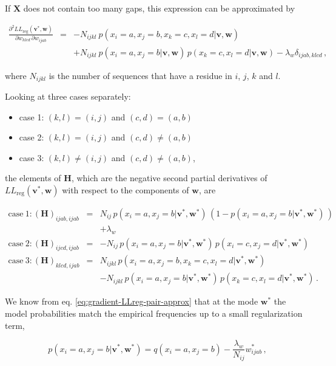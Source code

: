 \documentclass[11pt,a4paper,twoside]{book}
\providecommand{\tightlist}{%
  \setlength{\itemsep}{0pt}\setlength{\parskip}{0pt}}
\newcommand{\eq}{\!=\!}
\renewcommand{\H}{\mathbf{H}}
\newcommand{\LLreg}{L\!L_\mathrm{reg}}
\renewcommand{\v}{\mathbf{v}}
\newcommand{\w}{\mathbf{w}}
\newcommand{\wijab}{w_{ijab}}
\newcommand{\wklcd}{w_{klcd}}
\newcommand{\X}{\mathbf{X}}
\theoremstyle{definition}
\theoremstyle{definition}
\theoremstyle{remark}
\begin{document}
If \(\X\) does not contain too many gaps, this expression can be
approximated by

\begin{eqnarray}
    \frac{\partial^2 \LLreg(\v^*,\w)}{\partial \wklcd \, \partial \wijab  } 
    &=& - N_{ijkl} \: p(x_i \eq a, x_j \eq b, x_k \eq c, x_l \eq d | \v,\w)  \nonumber \\
    && +  N_{ijkl} \: p(x_i \eq a, x_j \eq b | \v,\w) \, p(x_k \eq c, x_l \eq d | \v,\w) - \lambda_w \delta_{ijab,klcd} \,,
\end{eqnarray}

where \(N_{ijkl}\) is the number of sequences that have a residue in
\(i\), \(j\), \(k\) and \(l\).

Looking at three cases separately:

\begin{itemize}
\tightlist
\item
  case 1: \((k,l) = (i,j)\) and \((c,d) = (a,b)\)
\item
  case 2: \((k,l) = (i,j)\) and \((c,d) \ne (a,b)\)
\item
  case 3: \((k,l) \ne (i,j)\) and \((c,d) \ne (a,b)\),
\end{itemize}

the elements of \(\H\), which are the negative second partial
derivatives of \(\LLreg(\v^*,\w)\) with respect to the components of
\(\w\), are

\begin{eqnarray}
  \mathrm{case~1:} (\H)_{ijab, ijab} &=& N_{ij} \, p(x_i \eq a, x_j \eq b| \v^*,\w^*) \, ( 1 - p(x_i \eq a, x_j \eq b| \v^*,\w^*) \,) \nonumber \\
                                      && +\lambda_w \\
  \mathrm{case~2:} (\H)_{ijcd, ijab} &=& -N_{ij} \, p(x_i \eq a, x_j \eq b |\v^*,\w^*) \, p(x_i \eq c, x_j \eq d |\v^*,\w^*) \\
  \mathrm{case~3:} (\H)_{klcd, ijab} &=& N_{ijkl} \, p(x_i \eq a, x_j \eq b, x_k \eq c, x_l \eq d  | \v^*,\w^*) \nonumber \\
                                      && -N_{ijkl} \, p(x_i \eq a, x_j \eq b | \v^*,\w^*)\, p(x_k \eq c, x_l \eq d | \v^*,\w^*) \,.
\label{eq:Hw-offdiag}
\end{eqnarray}

We know from eq. \eqref{eq:gradient-LLreg-pair-approx} that at the mode
\(\w^*\) the model probabilities match the empirical frequencies up to a
small regularization term,

\begin{equation}
    p(x_i \eq a, x_j \eq b | \v^*,\w^*) = q(x_i \eq a, x_j \eq b) - \frac{\lambda_w}{N_{ij}}  \wijab^* \,,
\end{equation}
\end{document}
